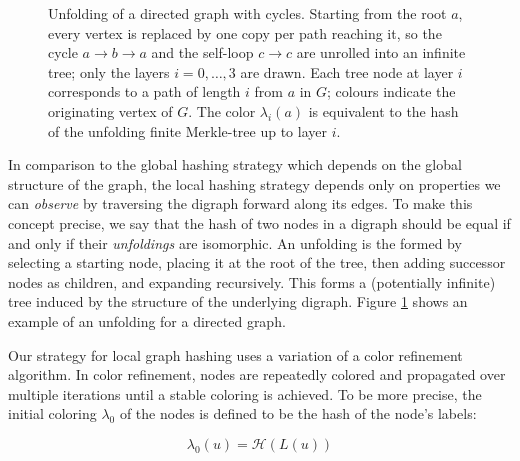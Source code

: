 \documentclass[twoside,leqno]{article}
\begin{document}
\begin{figure}[htbp]
\caption{Unfolding of a directed graph with cycles. Starting from the root
$a$, every vertex is replaced by one copy per path reaching it, so the cycle
$a\to b\to a$ and the self-loop $c\to c$ are unrolled into an infinite tree;
only the layers $i=0,\dots,3$ are drawn. Each tree node at layer $i$
corresponds to a path of length $i$ from $a$ in $G$; colours indicate the
originating vertex of $G$. The color $\lambda_i(a)$ is equivalent to the hash
of the unfolding finite Merkle-tree up to layer $i$.}
\label{fig:unfolding}
\end{figure}

In comparison to the global hashing strategy which depends on the global structure of the graph, the local hashing strategy depends only on properties we can \textit{observe} by traversing the digraph forward along its edges. To make this concept precise, we say that the hash of two nodes in a digraph should be equal if and only if their \textit{unfoldings} are isomorphic. An unfolding is the formed by selecting a starting node, placing it at the root of the tree, then adding successor nodes as children, and expanding recursively. This forms a (potentially infinite) tree induced by the structure of the underlying digraph. Figure \ref{fig:unfolding} shows an example of an unfolding for a directed graph.

Our strategy for local graph hashing uses a variation of a color refinement algorithm. In color refinement, nodes are repeatedly colored and propagated over multiple iterations until a stable coloring is achieved. To be more precise, the initial coloring $\lambda_0$ of the nodes is defined to be the hash of the node's labels:

\begin{equation}
  \lambda_0(u) = \mathcal{H}(L(u))
\end{equation}
\end{document}
